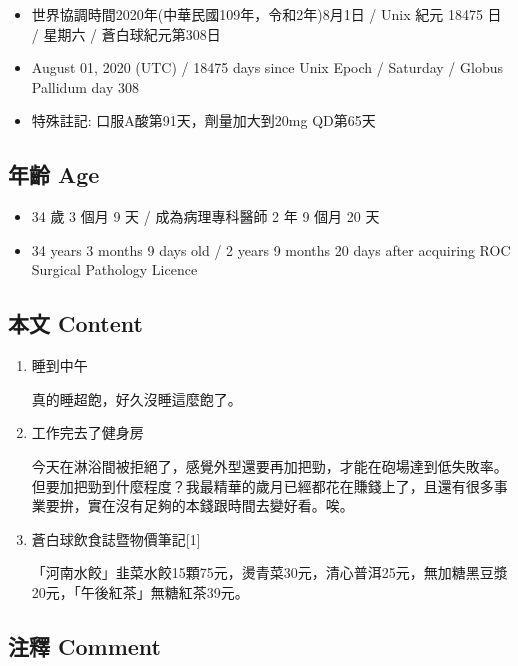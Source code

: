 \documentclass[a5paper, 11pt
]{book}
\providecommand{\tightlist}{%
  \setlength{\itemsep}{0pt}\setlength{\parskip}{0pt}}
\begin{document}
\begin{itemize}
\tightlist
\item
  世界協調時間2020年(中華民國109年，令和2年)8月1日 / Unix 紀元 18475 日
  / 星期六 / 蒼白球紀元第308日
\item
  August 01, 2020 (UTC) / 18475 days since Unix Epoch / Saturday /
  Globus Pallidum day 308
\item
  特殊註記: 口服A酸第91天，劑量加大到20mg QD第65天
\end{itemize}

\hypertarget{ux5e74ux9f61-age-61}{%
\subsection{年齡 Age}\label{ux5e74ux9f61-age-61}}

\begin{itemize}
\tightlist
\item
  34 歲 3 個月 9 天 / 成為病理專科醫師 2 年 9 個月 20 天
\item
  34 years 3 months 9 days old / 2 years 9 months 20 days after
  acquiring ROC Surgical Pathology Licence
\end{itemize}

\hypertarget{ux672cux6587-content-61}{%
\subsection{本文 Content}\label{ux672cux6587-content-61}}

\begin{enumerate}
\def\labelenumi{\arabic{enumi}.}
\item
  睡到中午

  真的睡超飽，好久沒睡這麼飽了。
\item
  工作完去了健身房

  今天在淋浴間被拒絕了，感覺外型還要再加把勁，才能在砲場達到低失敗率。但要加把勁到什麼程度？我最精華的歲月已經都花在賺錢上了，且還有很多事業要拚，實在沒有足夠的本錢跟時間去變好看。唉。
\item
  蒼白球飲食誌暨物價筆記{[}1{]}

  「河南水餃」韭菜水餃15顆75元，燙青菜30元，清心普洱25元，無加糖黑豆漿20元，「午後紅茶」無糖紅茶39元。
\end{enumerate}

\hypertarget{ux6ce8ux91cb-comment-61}{%
\subsection{注釋 Comment}\label{ux6ce8ux91cb-comment-61}}
\end{document}
